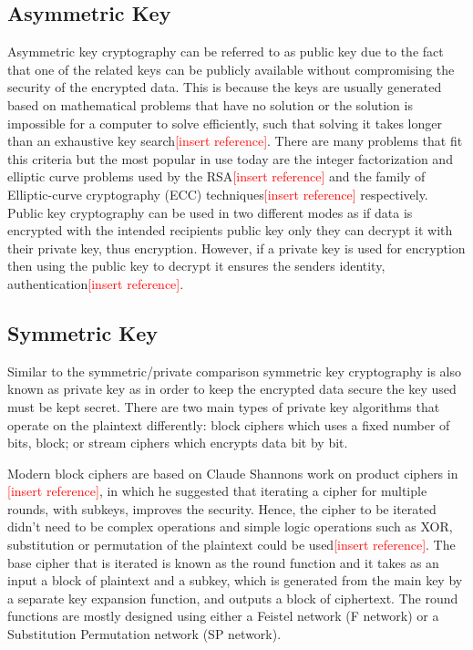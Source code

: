\documentclass[12pt,twoside,a4paper]{report}
\begin{document}
    \subsection{Asymmetric Key}
    Asymmetric key cryptography can be referred to as public key due to the fact that one of the related keys can be publicly available without compromising the security of the encrypted data. This is because the keys are usually generated based on mathematical problems that have no solution or the solution is impossible for a computer to solve efficiently, such that solving it takes longer than an exhaustive key search\textcolor{red}{[insert reference]}. There are many problems that fit this criteria but the most popular in use today are the integer factorization and elliptic curve problems used by the RSA\textcolor{red}{[insert reference]} and the family of Elliptic-curve cryptography (ECC) techniques\textcolor{red}{[insert reference]} respectively. Public key cryptography can be used in two different modes as if data is encrypted with the intended recipients public key only they can decrypt it with their private key, thus encryption. However, if a private key is used for encryption then using the public key to decrypt it ensures the senders identity, authentication\textcolor{red}{[insert reference]}.
    
    \subsection{Symmetric Key}
    Similar to the symmetric/private comparison symmetric key cryptography is also known as private key as in order to keep the encrypted data secure the key used must be kept secret. There are two main types of private key algorithms that operate on the plaintext differently: block ciphers which uses a fixed number of bits, block; or stream ciphers which encrypts data bit by bit.
    
    Modern block ciphers are based on Claude Shannons work on product ciphers in \textcolor{red}{[insert reference]}, in which he suggested that iterating a cipher for multiple rounds, with subkeys, improves the security. Hence, the cipher to be iterated didn't need to be complex operations and simple logic operations such as XOR, substitution or permutation of the plaintext could be used\textcolor{red}{[insert reference]}. The base cipher that is iterated is known as the round function and it takes as an input a block of plaintext and a subkey, which is generated from the main key by a separate key expansion function, and outputs a block of ciphertext. The round functions are mostly designed using either a Feistel network (F network) or a Substitution Permutation network (SP network).
    
\end{document}
